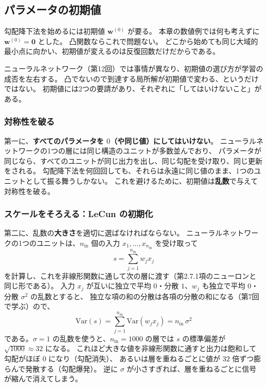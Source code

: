
\subsection{パラメータの初期値}  %

勾配降下法を始めるには初期値 $\bm{w}^{(0)}$ が要る。
本章の数値例では何も考えずに $\bm{w}^{(0)} = \bm{0}$ とした。
凸関数ならこれで問題ない。
どこから始めても同じ大域的最小点に向かい、初期値が変えるのは反復回数だけだからである。

ニューラルネットワーク（第12回）では事情が異なり、初期値の選び方が学習の成否を左右する。
凸でないので到達する局所解が初期値で変わる、というだけではない。
初期値には2つの要請があり、それぞれに「してはいけないこと」がある。

\subsubsection{対称性を破る}

第一に、\textbf{すべてのパラメータを $0$（や同じ値）にしてはいけない}。
ニューラルネットワークの1つの層には同じ構造のユニットが多数並んでおり、
パラメータが同じなら、すべてのユニットが同じ出力を出し、同じ勾配を受け取り、同じ更新をされる。
勾配降下法を何回回しても、それらは永遠に同じ値のまま、1つのユニットとして振る舞うしかない。
これを避けるために、初期値は\textbf{乱数}で与えて対称性を破る。

\subsubsection{スケールをそろえる：LeCun の初期化}

第二に、乱数の\textbf{大きさ}を適切に選ばなければならない。
ニューラルネットワークの1つのユニットは、$n_{\text{in}}$ 個の入力 $x_1, \ldots, x_{n_{\text{in}}}$ を受け取って
\begin{equation*}
  s = \sum_{j=1}^{n_{\text{in}}} w_j x_j
\end{equation*}
を計算し、これを非線形関数に通して次の層に渡す（第2.7.1項のニューロンと同じ形である）。
入力 $x_j$ が互いに独立で平均 $0$・分散 $1$、$w_j$ も独立で平均 $0$・分散 $\sigma^2$ の乱数とすると、
独立な項の和の分散は各項の分散の和になる（第7回で学ぶ）ので、
\begin{equation}
  \mathrm{Var}(s) = \sum_{j=1}^{n_{\text{in}}} \mathrm{Var}(w_j x_j) = n_{\text{in}}\,\sigma^2
  \label{eq:init-var}
\end{equation}
である。$\sigma = 1$ の乱数を使うと、$n_{\text{in}} = 1000$ の層では $s$ の標準偏差が $\sqrt{1000} \approx 32$ になる。
これほど大きな値を非線形関数に通すと出力は飽和して勾配がほぼ $0$ になり（勾配消失）、
あるいは層を重ねるごとに値が $32$ 倍ずつ膨らんで発散する（勾配爆発）。
逆に $\sigma$ が小さすぎれば、層を重ねるごとに信号が縮んで消えてしまう。

